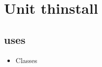 \documentclass{report}
\begin{document}
\chapter{Unit thinstall}
\label{thinstall}
\section{uses}
\begin{itemize}
\item \begin{ttfamily}Classes\end{ttfamily}\
\end{itemize}
\end{document}
